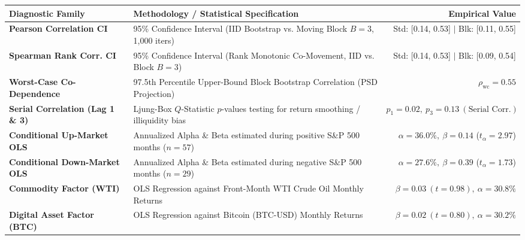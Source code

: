 \documentclass[10pt,a4paper]{article}
\begin{document}
\begin{tcolorbox}[colback=white, colframe=primary, title=\textbf{\small\strut Appendix A: Extended Statistical, Bootstrap \& Factor Diagnostics}, fonttitle=\sffamily\bfseries\small, arc=5pt, boxrule=0.8pt, toptitle=4pt, bottomtitle=4pt, left=6pt, right=6pt, top=4pt, bottom=4pt, colbacktitle=primary]
\renewcommand{\arraystretch}{1.25}
\scriptsize
\begin{tabularx}{\textwidth}{l X r}
\toprule
\textbf{\textcolor{primary}{Diagnostic Family}} & \textbf{\textcolor{primary}{Methodology / Statistical Specification}} & \textbf{\textcolor{primary}{Empirical Value}} \\
\midrule
\textbf{Pearson Correlation CI} & 95\% Confidence Interval (IID Bootstrap vs. Moving Block $B=3$, 1,000 iters) & Std: [0.14, 0.53] $\vert$ Blk: [0.11, 0.55] \\
\rowcolor{cardbg} \textbf{Spearman Rank Corr. CI} & 95\% Confidence Interval (Rank Monotonic Co-Movement, IID vs. Block $B=3$) & Std: [0.14, 0.53] $\vert$ Blk: [0.09, 0.54] \\
\textbf{Worst-Case Co-Dependence} & 97.5th Percentile Upper-Bound Block Bootstrap Correlation (PSD Projection) & $\rho_{\text{wc}} = 0.55$ \\
\rowcolor{cardbg} \textbf{Serial Correlation (Lag 1 \& 3)} & Ljung-Box $Q$-Statistic $p$-values testing for return smoothing / illiquidity bias & $p_1=0.02,\ p_3=0.13\ (\text{Serial Corr.})$ \\
\textbf{Conditional Up-Market OLS} & Annualized Alpha \& Beta estimated during positive S\&P 500 months ($n=57$) & $\alpha=36.0\%,\ \beta=0.14$ ($t_\alpha=2.97$) \\
\rowcolor{cardbg} \textbf{Conditional Down-Market OLS} & Annualized Alpha \& Beta estimated during negative S\&P 500 months ($n=29$) & $\alpha=27.6\%,\ \beta=0.39$ ($t_\alpha=1.73$) \\
\textbf{Commodity Factor (WTI)} & OLS Regression against Front-Month WTI Crude Oil Monthly Returns & $\beta=0.03\ (t=0.98),\ \alpha=30.8\%$ \\
\rowcolor{cardbg} \textbf{Digital Asset Factor (BTC)} & OLS Regression against Bitcoin (BTC-USD) Monthly Returns & $\beta=0.02\ (t=0.80),\ \alpha=30.2\%$ \\
\bottomrule
\end{tabularx}
\end{tcolorbox}

\vspace{0.35em}
\end{document}
